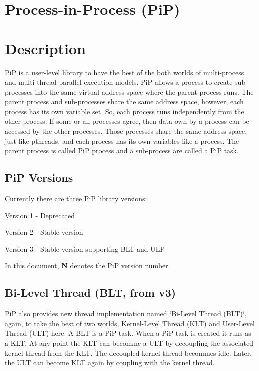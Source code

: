 \section*{Process-\/in-\/\-Process (Pi\-P)}

\section*{Description}

Pi\-P is a user-\/level library to have the best of the both worlds of multi-\/process and multi-\/thread parallel execution models. Pi\-P allows a process to create sub-\/processes into the same virtual address space where the parent process runs. The parent process and sub-\/processes share the same address space, however, each process has its own variable set. So, each process runs independently from the other process. If some or all processes agree, then data own by a process can be accessed by the other processes. Those processes share the same address space, just like pthreads, and each process has its own variables like a process. The parent process is called Pi\-P process and a sub-\/process are called a Pi\-P task.

\subsection*{Pi\-P Versions}

Currently there are three Pi\-P library versions\-:


\begin{DoxyItemize}
\item Version 1 -\/ Deprecated
\item Version 2 -\/ Stable version
\item Version 3 -\/ Stable version supporting B\-L\-T and U\-L\-P
\end{DoxyItemize}

In this document, {\bfseries N} denotes the Pi\-P version number.

\subsection*{Bi-\/\-Level Thread (B\-L\-T, from v3)}

Pi\-P also provides new thread implementation named \char`\"{}\-Bi-\/\-Level Thread
(\-B\-L\-T)\char`\"{}, again, to take the best of two worlds, Kernel-\/\-Level Thread (K\-L\-T) and User-\/\-Level Thread (U\-L\-T) here. A B\-L\-T is a Pi\-P task. When a Pi\-P task is created it runs as a K\-L\-T. At any point the K\-L\-T can becomme a U\-L\-T by decoupling the associated kernel thread from the K\-L\-T. The decoupled kernel thread becommes idle. Later, the U\-L\-T can become K\-L\-T again by coupling with the kernel thread.

